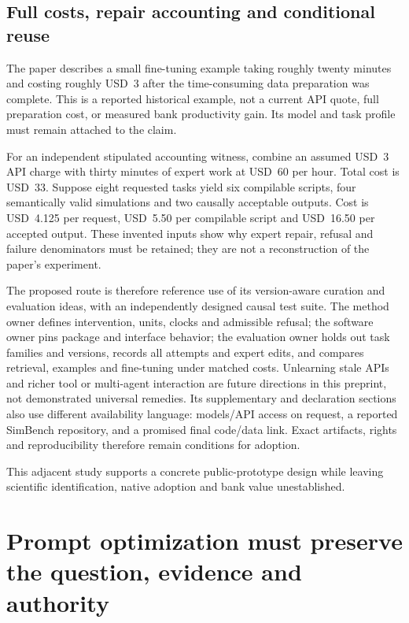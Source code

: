 \subsection{Full costs, repair accounting and conditional reuse}
The paper describes a small fine-tuning example taking roughly twenty minutes
and costing roughly USD~3 after the time-consuming data preparation was
complete. This is a reported historical example, not a current API quote,
full preparation cost, or measured bank productivity gain. Its model and task
profile must remain attached to the claim.~\citep{exec24_chronollm_original}

For an independent stipulated accounting witness, combine an assumed USD~3
API charge with thirty minutes of expert work at USD~60 per hour. Total cost
is USD~33. Suppose eight requested tasks yield six compilable scripts, four
semantically valid simulations and two causally acceptable outputs. Cost is
USD~4.125 per request, USD~5.50 per compilable script and USD~16.50 per
accepted output. These invented inputs show why expert repair, refusal and
failure denominators must be retained; they are not a reconstruction of the
paper's experiment.~\citep{exec24_chronollm_reference}

The proposed route is therefore reference use of its version-aware curation
and evaluation ideas, with an independently designed causal test suite.
The method owner defines intervention, units, clocks and admissible refusal;
the software owner pins package and interface behavior; the evaluation owner
holds out task families and versions, records all attempts and expert edits,
and compares retrieval, examples and fine-tuning under matched costs.
Unlearning stale APIs and richer tool or multi-agent interaction are future
directions in this preprint, not demonstrated universal remedies. Its
supplementary and declaration sections also use different availability
language: models/API access on request, a reported SimBench repository, and
a promised final code/data link. Exact artifacts, rights and reproducibility
therefore remain conditions for adoption.~\citep{exec24_chronollm_original}

This adjacent study supports a concrete public-prototype design while leaving
scientific identification, native adoption and bank value unestablished.


\section{Prompt optimization must preserve the question, evidence and authority}
\label{sec:exec24-prompt-engineering}

